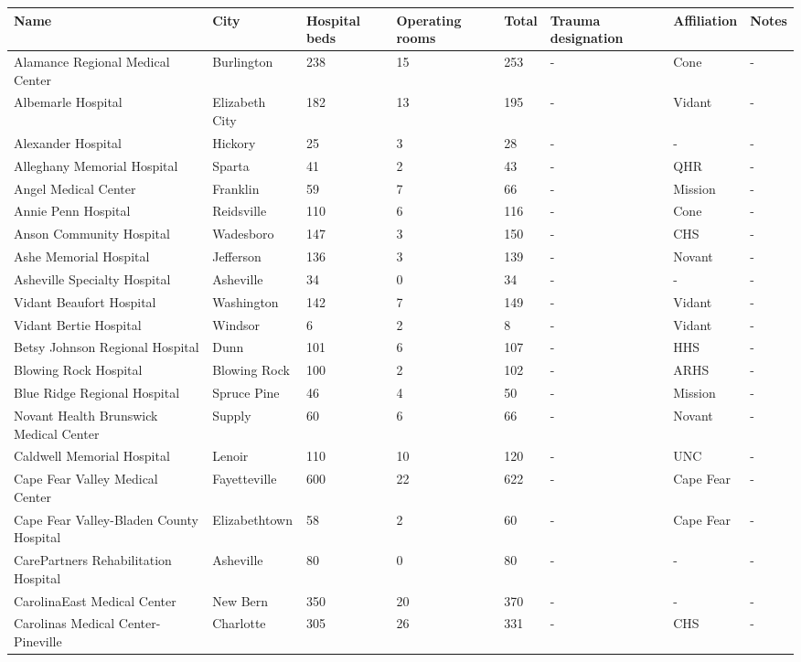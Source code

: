 \documentclass{article}
\begin{document}
\begin{tabular}{llllllll}
\toprule
Name & City & Hospital beds & Operating rooms & Total & Trauma designation & Affiliation & Notes \\
\midrule
Alamance Regional Medical Center & Burlington & 238 & 15 & 253 & - & Cone & - \\
Albemarle Hospital & Elizabeth City & 182 & 13 & 195 & - & Vidant & - \\
Alexander Hospital & Hickory & 25 & 3 & 28 & - & - & - \\
Alleghany Memorial Hospital & Sparta & 41 & 2 & 43 & - & QHR & - \\
Angel Medical Center & Franklin & 59 & 7 & 66 & - & Mission & - \\
Annie Penn Hospital & Reidsville & 110 & 6 & 116 & - & Cone & - \\
Anson Community Hospital & Wadesboro & 147 & 3 & 150 & - & CHS & - \\
Ashe Memorial Hospital & Jefferson & 136 & 3 & 139 & - & Novant & - \\
Asheville Specialty Hospital & Asheville & 34 & 0 & 34 & - & - & - \\
Vidant Beaufort Hospital & Washington & 142 & 7 & 149 & - & Vidant & - \\
Vidant Bertie Hospital & Windsor & 6 & 2 & 8 & - & Vidant & - \\
Betsy Johnson Regional Hospital & Dunn & 101 & 6 & 107 & - & HHS & - \\
Blowing Rock Hospital & Blowing Rock & 100 & 2 & 102 & - & ARHS & - \\
Blue Ridge Regional Hospital & Spruce Pine & 46 & 4 & 50 & - & Mission & - \\
Novant Health Brunswick Medical Center & Supply & 60 & 6 & 66 & - & Novant & - \\
Caldwell Memorial Hospital & Lenoir & 110 & 10 & 120 & - & UNC & - \\
Cape Fear Valley Medical Center & Fayetteville & 600 & 22 & 622 & - & Cape Fear & - \\
Cape Fear Valley-Bladen County Hospital & Elizabethtown & 58 & 2 & 60 & - & Cape Fear & - \\
CarePartners Rehabilitation Hospital & Asheville & 80 & 0 & 80 & - & - & - \\
CarolinaEast Medical Center & New Bern & 350 & 20 & 370 & - & - & - \\
Carolinas Medical Center-Pineville & Charlotte & 305 & 26 & 331 & - & CHS & - \\

\end{tabular}
\end{document}
